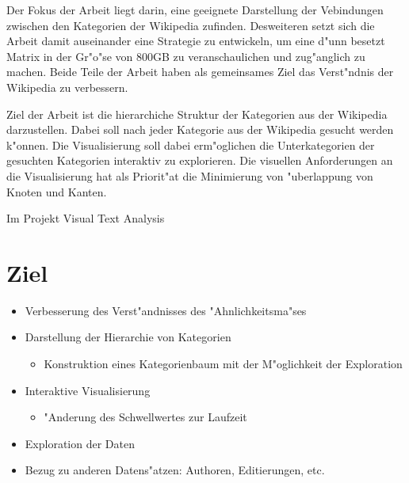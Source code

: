 Der Fokus der Arbeit liegt darin, eine geeignete Darstellung der Vebindungen zwischen den Kategorien der Wikipedia zufinden.
Desweiteren setzt sich die Arbeit damit auseinander eine Strategie zu entwickeln, um eine d"unn besetzt Matrix in der Gr"o"se von 800GB zu veranschaulichen und zug"anglich zu machen.
Beide Teile der Arbeit haben als gemeinsames Ziel das Verst"ndnis der Wikipedia zu verbessern.

Ziel der Arbeit ist die hierarchiche Struktur der Kategorien aus der Wikipedia darzustellen.
Dabei soll nach jeder Kategorie aus der Wikipedia gesucht werden k"onnen.
Die Visualisierung soll dabei erm"oglichen die Unterkategorien der gesuchten Kategorien interaktiv zu explorieren.
Die visuellen Anforderungen an die Visualisierung hat als Priorit"at die Minimierung von "uberlappung von Knoten und Kanten.


Im  Projekt Visual Text Analysis


\section{Ziel}
\begin{itemize}
    \item Verbesserung des Verst"andnisses des "Ahnlichkeitsma"ses
    \item Darstellung der Hierarchie von Kategorien
    \begin{itemize}
      \item Konstruktion eines Kategorienbaum mit der M"oglichkeit der Exploration
    \end{itemize}
    \item Interaktive Visualisierung
    \begin{itemize}
      \item "Anderung des Schwellwertes zur Laufzeit
    \end{itemize}
    \item Exploration der Daten
    \item Bezug zu anderen Datens"atzen: Authoren, Editierungen, etc.
\end{itemize}















